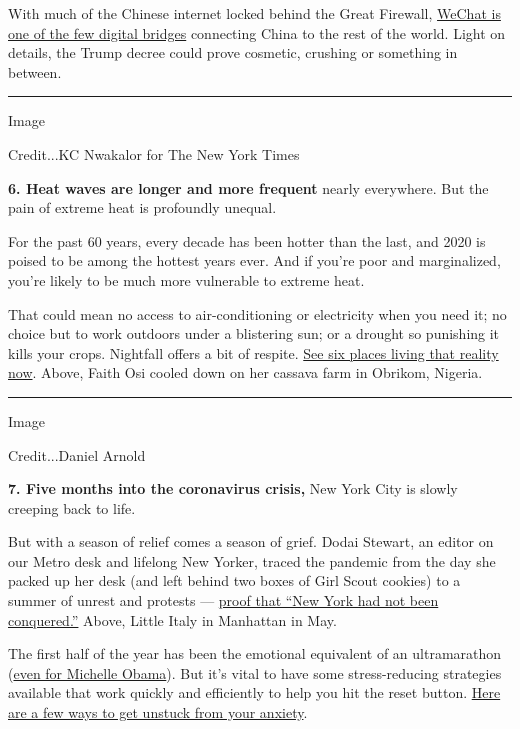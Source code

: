 With much of the Chinese internet locked behind the Great Firewall,
\href{https://www.nytimes3xbfgragh.onion/2020/08/07/business/trump-china-wechat-tiktok.html}{WeChat
is one of the few digital bridges} connecting China to the rest of the
world. Light on details, the Trump decree could prove cosmetic, crushing
or something in between.

\begin{center}\rule{0.5\linewidth}{\linethickness}\end{center}

Image

Credit...KC Nwakalor for The New York Times

\textbf{6. Heat waves are longer and more frequent} nearly everywhere.
But the pain of extreme heat is profoundly unequal.

For the past 60 years, every decade has been hotter than the last, and
2020 is poised to be among the hottest years ever. And if you're poor
and marginalized, you're likely to be much more vulnerable to extreme
heat.

That could mean no access to air-conditioning or electricity when you
need it; no choice but to work outdoors under a blistering sun; or a
drought so punishing it kills your crops. Nightfall offers a bit of
respite.
\href{https://www.nytimes3xbfgragh.onion/interactive/2020/08/06/climate/climate-change-inequality-heat.html?}{See
six places living that reality now}. Above, Faith Osi cooled down on her
cassava farm in Obrikom, Nigeria.

\begin{center}\rule{0.5\linewidth}{\linethickness}\end{center}

Image

Credit...Daniel Arnold

\textbf{7. Five months into the coronavirus crisis,} New York City is
slowly creeping back to life.

But with a season of relief comes a season of grief. Dodai Stewart, an
editor on our Metro desk and lifelong New Yorker, traced the pandemic
from the day she packed up her desk (and left behind two boxes of Girl
Scout cookies) to a summer of unrest and protests ---
\href{https://www.nytimes3xbfgragh.onion/2020/08/07/style/coronavirus-nyc-historic-season.html?}{proof
that ``New York had not been conquered.''} Above, Little Italy in
Manhattan in May.

The first half of the year has been the emotional equivalent of an
ultramarathon
(\href{https://www.nytimes3xbfgragh.onion/2020/08/06/us/michelle-obama-depression.html}{even
for Michelle Obama}). But it's vital to have some stress-reducing
strategies available that work quickly and efficiently to help you hit
the reset button.
\href{https://www.nytimes3xbfgragh.onion/2020/08/06/well/mind/five-minute-coronavirus-stress-resets.html}{Here
are a few ways to get unstuck from your anxiety}.

